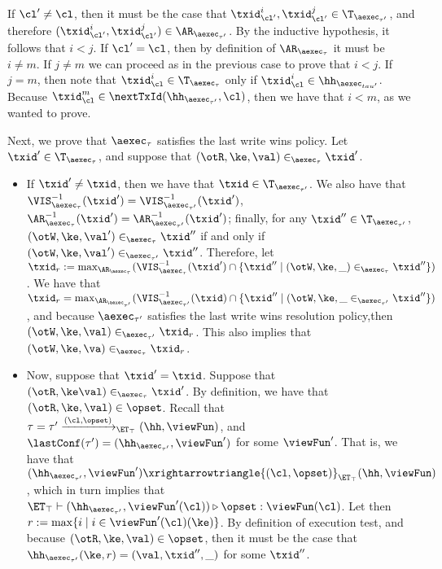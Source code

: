 \begin{itemize}
\begin{itemize}
If $\cl' \neq \cl$, then it must be the case that $\txid_{\cl'}^{i}, \txid_{\cl'}^{j} \in \T_{\aexec_{\tau'}}$, 
and therefore $(\txid_{\cl'}^{i}, \txid_{\cl'}^{j}) \in \AR_{\aexec_{\tau'}}$. By the inductive hypothesis, 
it follows that $i < j$. If $\cl' = \cl$, then by definition of $\AR_{\aexec_{\tau}}$ it must be  $i \neq m$. 
If $j \neq m$ we can proceed as in the previous case to prove that $i < j$. If $j = m$, then 
note that $\txid_{\cl}^{i} \in \T_{\aexec_{\tau}}$ only if $\txid_{\cl}^{i} \in \hh_{\aexec_{tau'}}$. 
Because $\txid_{\cl}^{m} \in \nextTxId(\hh_{\aexec_{\tau'}}, \cl)$, then we have that $i < m$, 
as we wanted to prove.
\end{itemize}

Next, we prove that $\aexec_{\tau}$ satisfies the last write wins policy. 
Let $\txid' \in \T_{\aexec_{\tau}}$, and suppose that $(\otR, \ke, \val) \in_{\aexec_{\tau}} \txid'$. 
\begin{itemize} 
\item If $\txid' \neq \txid$, then we have that $\txid \in \T_{\aexec_{\tau'}}$. We also have that 
$\VIS^{-1}_{\aexec_{\tau}}(\txid') = \VIS^{-1}_{\aexec_{\tau'}}(\txid')$, $\AR^{-1}_{\aexec_{\tau}}(\txid') 
= \AR^{-1}_{\aexec_{\tau'}}(\txid')$; finally, for any $\txid'' \in \T_{\aexec_{\tau'}}$, 
$(\otW, \ke, \val') \in_{\aexec_{\tau}} \txid''$ if and only if $(\otW, \ke, \val') \in_{\aexec_{\tau'}} 
\txid''$. Therefore, let $\txid_{r} := \max_{\AR_{\aexec_{\tau}}}(\VIS^{-1}_{\aexec_{\tau}}(\txid') \cap 
\{\txid'' \mid (\otW, \ke, \_) \in_{\aexec_{\tau}} \txid''\})$. We have that $\txid_{r} = \max_{\AR_{\aexec_{\tau'}}}(\VIS^{-1}_{\aexec_{\tau'}}(\txid) 
\cap \{ \txid'' \mid (\otW, \ke, \_ \in_{\aexec_{\tau'}} \txid''\})$, and because $\aexec_{\tau'}$ satisfies the last write 
wins resolution policy,then $(\otW, \ke, \val) \in_{\aexec_{\tau'}} \txid_{r}$. This also implies that 
$(\otW, \ke, \va) \in_{\aexec_{\tau}} \txid_{r}$. 

\item Now, suppose that $\txid' = \txid$. Suppose that $(\otR, \ke \val) \in_{\aexec_{\tau}} \txid'$. 
By definition, we have that $(\otR, \ke, \val) \in \opset$. Recall that $\tau = \tau' \xrightarrow{(\cl, \opset)}_{\ET_{\top}} (\hh, \viewFun)$, 
and $\lastConf(\tau') = (\hh_{\aexec_{\tau'}}, \viewFun')$ for some $\viewFun'$. That is, we have that 
$(\hh_{\aexec_{\tau'}}, \viewFun') \xrightarrowtriangle{(\cl, \opset)}_{\ET_{\top}} (\hh, \viewFun)$, 
which in turn implies that $\ET_{\top} \vdash (\hh_{\aexec_{\tau'}}, \viewFun'(\cl)) \triangleright \opset : \viewFun(\cl)$. 
Let then $r : = \max\{i \mid  i \in \viewFun'(\cl)(\ke)\}$. 
By definition of execution test, and because $(\otR, \ke, \val) \in \opset$, then it must be the case that 
$\hh_{\aexec_{\tau'}}(\ke, r) = (\val, \txid'', \_)$ for some $\txid''$. 


\end{itemize}
\end{itemize}
